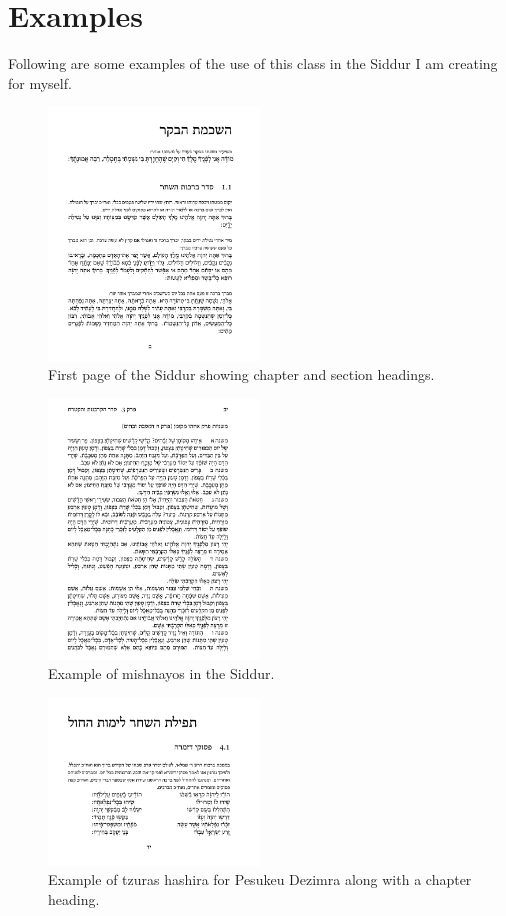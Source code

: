 \documentclass[12pt]{article}
\begin{document}
	\section{Examples}
	Following are some examples of the use of this class in the Siddur I am creating for myself.
	\begin{figure}[h!]
		\centering
		\includegraphics[width=0.5\textwidth]{hashkamas_haboker}
		\caption{First page of the Siddur showing chapter and section headings.}
	\end{figure}
	\begin{figure}[h!]
		\centering
		\includegraphics[width=0.5\textwidth]{eizehu_mekoman}
		\caption{Example of mishnayos in the Siddur.}
	\end{figure}
	\begin{figure}[h!]
		\centering
		\includegraphics[width=0.5\textwidth]{pesukei_dezimra}
		\caption{Example of tzuras  hashira for Pesukeu Dezimra along with a chapter heading.}
	\end{figure}
\end{document}
